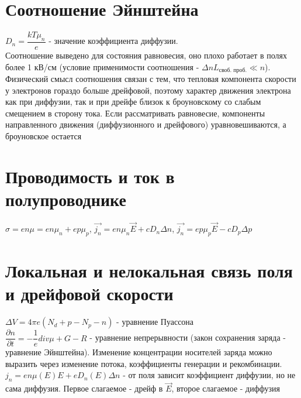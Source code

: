 \begin{multicols*}{2}
		\section{Соотношение Эйнштейна}
		$D_n = \dfrac{kT\mu_n}{e}$ - значение коэффициента диффузии. \\
		Соотношение выведено для состояния равновесия, оно плохо работает в полях более 1 кВ/см (условие применимости соотношения - $\Delta n L_\text{своб. проб.}\ll n$). Физический смысл соотношения связан с тем, что тепловая компонента скорости у электронов гораздо больше дрейфовой, поэтому характер движения электрона как при диффузии, так и при дрейфе близок к броуновскому со слабым смещением в сторону тока. Если рассматривать равновесие, компоненты направленного движения (диффузионного и дрейфового) уравновешиваются, а броуновское остается

		\section{Проводимость и ток в полупроводнике}
		$\sigma = en\mu = en\mu_n + ep\mu_p$, \quad $\vec{j_n} = en\mu_n\vec{E} + cD_n\Delta n$, \quad $\vec{j_n} = ep\mu_p\vec{E} - cD_p\Delta p$
		
		\section{Локальная и нелокальная связь поля и дрейфовой скорости}
		$\Delta V = 4 \pi e (N_d + p - N_p - n)$ - уравнение Пуассона\\
		$\dfrac{\partial n}{\partial t} = - \dfrac{1}{e} div \mu + G - R$ - уравнение непрерывности (закон сохранения заряда - уравнение Эйнштейна). Изменение концентрации носителей заряда можно выразить через изменение потока, коэффициенты генерации и рекомбинации.\\
		$j_n = en \mu(E) E + e D_n(E) \Delta n$ - от поля зависит коэффициент диффузии, но не сама диффузия. Первое слагаемое - дрейф в $\vec{E}$, второе слагаемое - диффузия


\end{multicols*}
